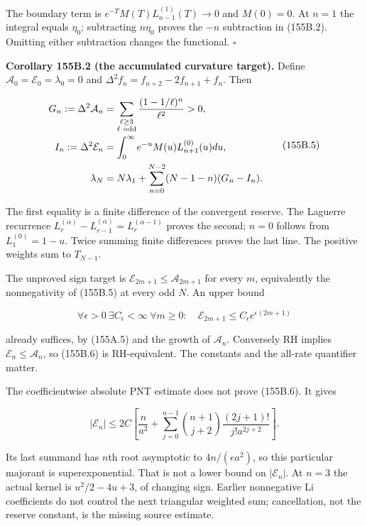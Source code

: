 \documentclass[
  11pt,
]{book}
\begin{document}
The boundary term is \(e^{-T}M(T)L_{n-1}^{(1)}(T)\to0\) and \(M(0)=0\).
At \(n=1\) the integral equals \(\eta_0\); subtracting \(n\eta_0\)
proves the \(-n\) subtraction in (155B.2). Omitting either subtraction
changes the functional. \(\square\)

\textbf{Corollary 155B.2 (the accumulated curvature target).} Define
\(\mathcal A_0=\mathcal E_0=\lambda_0=0\) and
\(\Delta^2 f_n=f_{n+2}-2f_{n+1}+f_n\). Then

\[
\begin{aligned}
G_n:=\Delta^2\mathcal A_n
 &=\sum_{\substack{\ell\ge3\\\ell\ {\rm odd}}}
       \frac{(1-1/\ell)^n}{\ell^2}>0,\\
I_n:=\Delta^2\mathcal E_n
 &=\int_0^\infty e^{-u}M(u)L_{n+1}^{(0)}(u)du,\\
\lambda_N&=N\lambda_1+
 \sum_{n=0}^{N-2}(N-1-n)(G_n-I_n).
\end{aligned}
\tag{155B.5}
\]

The first equality is a finite difference of the convergent reserve. The
Laguerre recurrence
\(L_r^{(\alpha)}-L_{r-1}^{(\alpha)}=L_r^{(\alpha-1)}\) proves the
second; \(n=0\) follows from \(L_1^{(0)}=1-u\). Twice summing finite
differences proves the last line. The positive weights sum to
\(T_{N-1}\).

The unproved sign target is \(\mathcal E_{2m+1}\le\mathcal A_{2m+1}\)
for every \(m\), equivalently the nonnegativity of (155B.5) at every odd
\(N\). An upper bound

\[
\forall\epsilon>0\ \exists C_\epsilon<\infty\ \forall m\ge0:
\quad\mathcal E_{2m+1}\le C_\epsilon e^{\epsilon(2m+1)}
\tag{155B.6}
\]

already suffices, by (155A.5) and the growth of \(\mathcal A_n\).
Conversely RH implies \(\mathcal E_n\le\mathcal A_n\), so (155B.6) is
RH-equivalent. The constants and the all-rate quantifier matter.

The coefficientwise absolute PNT estimate does not prove (155B.6). It
gives

\[
|\mathcal E_n|\le
2C\left[\frac n{a^2}+\sum_{j=0}^{n-1}
 \binom{n+1}{j+2}\frac{(2j+1)!}{j!a^{2j+2}}\right].
\tag{155B.7}
\]

Its last summand has \(n\)th root asymptotic to \(4n/(ea^2)\), so this
particular majorant is superexponential. That is not a lower bound on
\(|\mathcal E_n|\). At \(n=3\) the actual kernel is \(u^2/2-4u+3\), of
changing sign. Earlier nonnegative Li coefficients do not control the
next triangular weighted sum; cancellation, not the reserve constant, is
the missing source estimate.
\end{document}
